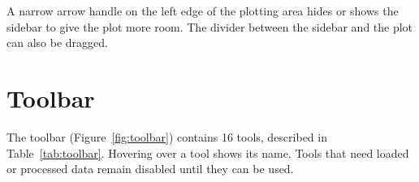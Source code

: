 A narrow arrow handle on the left edge of the plotting area hides or shows the sidebar to
give the plot more room. The divider between the sidebar and the plot can also be dragged.

\section{Toolbar}
\label{sec:toolbar}

The toolbar (Figure~\ref{fig:toolbar}) contains 16 tools, described in
Table~\ref{tab:toolbar}. Hovering over a tool shows its name. Tools that need loaded or
processed data remain disabled until they can be used.



